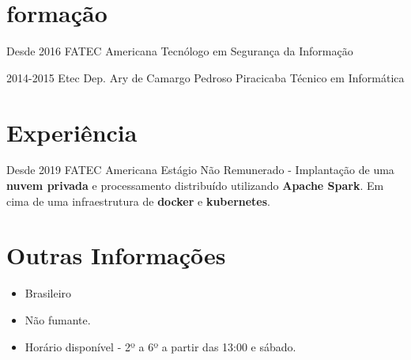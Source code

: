 \documentclass[]{twentysecondcv}
\begin{document}
\section{formação}	
	\begin{twenty}
		\twentyitem
			{Desde 2016}
			{FATEC}
			{Americana}
			{Tecnólogo em Segurança da Informação}
		\par
		\twentyitem
			{2014-2015}
			{Etec Dep. Ary de Camargo Pedroso}
			{Piracicaba}
			{Técnico em Informática}
	\end{twenty}
	\vfill
	
\section{Experiência}
	\begin{twenty}
		\twentyitem
			{Desde 2019}
			{FATEC}
			{Americana}
			{Estágio Não Remunerado - Implantação de uma \textbf{nuvem privada} e processamento distribuído utilizando \textbf{Apache Spark}. Em cima de uma infraestrutura de \textbf{docker} e \textbf{kubernetes}.}
	
	\end{twenty}
\vfill

\section{Outras Informações}
    \begin{itemize}
		\item Brasileiro
		\item Não fumante.
        \item Horário disponível - 2º a 6º a partir das 13:00 e sábado. 
    \end{itemize}    
\vfill
\end{document}
